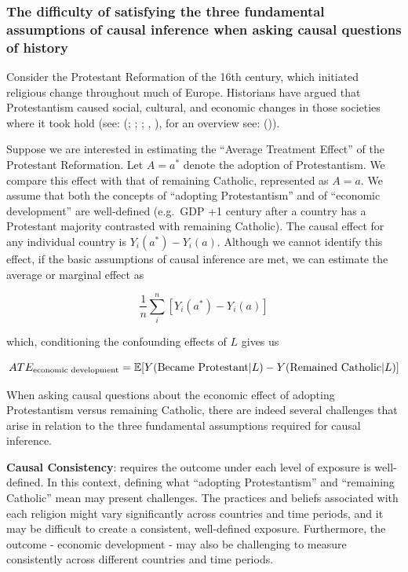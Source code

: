 \documentclass[
  singlecolumn]{article}
\begin{document}
\subsubsection{The difficulty of satisfying the three fundamental
assumptions of causal inference when asking causal questions of
history}\label{the-difficulty-of-satisfying-the-three-fundamental-assumptions-of-causal-inference-when-asking-causal-questions-of-history}

Consider the Protestant Reformation of the 16th century, which initiated
religious change throughout much of Europe. Historians have argued that
Protestantism caused social, cultural, and economic changes in those
societies where it took hold (see: (; ;
; , ), for an overview see:
()).

Suppose we are interested in estimating the ``Average Treatment Effect''
of the Protestant Reformation. Let \(A = a^*\) denote the adoption of
Protestantism. We compare this effect with that of remaining Catholic,
represented as \(A = a\). We assume that both the concepts of ``adopting
Protestantism'' and of ``economic development'' are well-defined
(e.g.~GDP +1 century after a country has a Protestant majority
contrasted with remaining Catholic). The causal effect for any
individual country is \(Y_i(a^*) - Y_i(a)\). Although we cannot identify
this effect, if the basic assumptions of causal inference are met, we
can estimate the average or marginal effect as

\[
\frac{1}{n} \sum_i^{n} \left[ Y_i(a^*) - Y_i(a) \right]
\]

which, conditioning the confounding effects of \(L\) gives us

\[ATE_{\textnormal{economic~development}} = \mathbb{E}[Y(\textnormal{Became~Protestant}|L) - Y(\textnormal{Remained~Catholic}|L)]\]

When asking causal questions about the economic effect of adopting
Protestantism versus remaining Catholic, there are indeed several
challenges that arise in relation to the three fundamental assumptions
required for causal inference.

\textbf{Causal Consistency}: requires the outcome under each level of
exposure is well-defined. In this context, defining what ``adopting
Protestantism'' and ``remaining Catholic'' mean may present challenges.
The practices and beliefs associated with each religion might vary
significantly across countries and time periods, and it may be difficult
to create a consistent, well-defined exposure. Furthermore, the outcome
- economic development - may also be challenging to measure consistently
across different countries and time periods.
\end{document}
